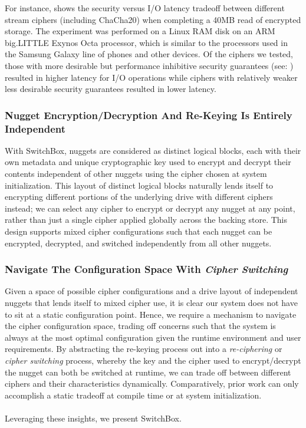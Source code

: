 For instance, 
shows the security versus I/O latency tradeoff between different stream ciphers
(including ChaCha20) when completing a 40MB read of encrypted storage. The
experiment was performed on a Linux RAM disk on an ARM big.LITTLE Exynos Octa
processor, which is similar to the processors used in the Samsung Galaxy line of
phones and other devices. Of the ciphers we tested, those with more desirable
but performance inhibitive security guarantees (see: ) resulted
in higher latency for I/O operations while ciphers with relatively weaker less
desirable security guarantees resulted in lower latency.

\subsubsection{Nugget Encryption/Decryption And Re-Keying Is Entirely Independent}

With SwitchBox, nuggets are considered as distinct logical blocks, each with
their own metadata and unique cryptographic key used to encrypt and decrypt
their contents independent of other nuggets using the cipher chosen at system
initialization. This layout of distinct logical blocks naturally lends itself to
encrypting different portions of the underlying drive with different ciphers
instead; we can select any cipher to encrypt or decrypt any nugget at any point,
rather than just a single cipher applied globally across the backing store. This
design supports mixed cipher configurations such that each nugget can be encrypted,
decrypted, and switched independently from all other nuggets.

\subsubsection{Navigate The Configuration Space With \emph{Cipher Switching}}

Given a space of possible cipher configurations and a drive layout of
independent nuggets that lends itself to mixed cipher use, it is clear our
system does not have to sit at a static configuration point. Hence, we require a
mechanism to navigate the cipher configuration space, trading off concerns such
that the system is always at the most optimal configuration given the runtime
environment and user requirements. By abstracting the re-keying process out into
a \emph{re-ciphering} or \emph{cipher switching} process, whereby the key and
the cipher used to encrypt/decrypt the nugget can both be switched at runtime,
we can trade off between different ciphers and their characteristics
dynamically. Comparatively, prior work can only accomplish a static tradeoff at
compile time or at system initialization. \\
\\
Leveraging these insights, we present SwitchBox. 

